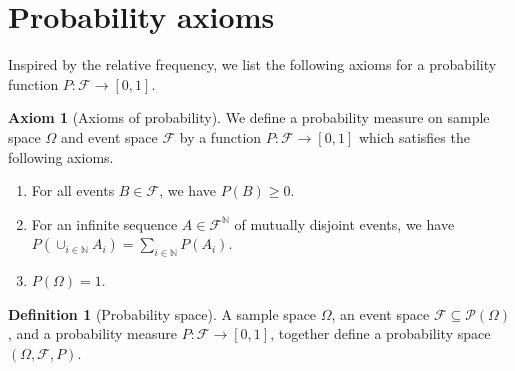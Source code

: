 \documentclass[letterpaper,10pt,english]{article}
\theoremstyle{plain}
\theoremstyle{definition}
\newtheorem{defn}[thm]{Definition}
\newtheorem{axiom}[thm]{Axiom}
\theoremstyle{remark}
\newcommand{\N}{\mathbb{N}}
\newcommand{\cP}{\mathcal{P}}
\newcommand{\sF}{\mathscr{F}}
\renewcommand{\ge}{\geqslant}
\begin{document}
\section{Probability axioms}
Inspired by the relative frequency, we list the following axioms for a probability function $P: \sF \to [0,1]$. 
\begin{axiom}[Axioms of probability]
We define a probability measure on sample space $\Omega$ and event space $\sF$ by a function $P: \sF \to [0,1]$ which satisfies the following axioms. 
\begin{enumerate}
\item  [\textbf{Non-negativity:}] For all events $B \in \sF$, we have $P(B) \ge 0$. 
\item  [\textbf{$\sigma$-additivity:}] For an infinite sequence $A \in \sF^\N$ of mutually disjoint events,  
we have $P(\cup_{i \in \N}A_i) = \sum_{i \in \N}P(A_i)$. 
\item [\textbf{Certainty:}] $P(\Omega) = 1$. 
\end{enumerate} 
\end{axiom}
\begin{defn}[Probability space] 
A sample space $\Omega$, an event space $\sF\subseteq \cP(\Omega)$, 
and a probability measure $P: \sF \to [0,1]$, 
together define a probability space $(\Omega,\sF,P)$.
\end{defn}
\end{document}
